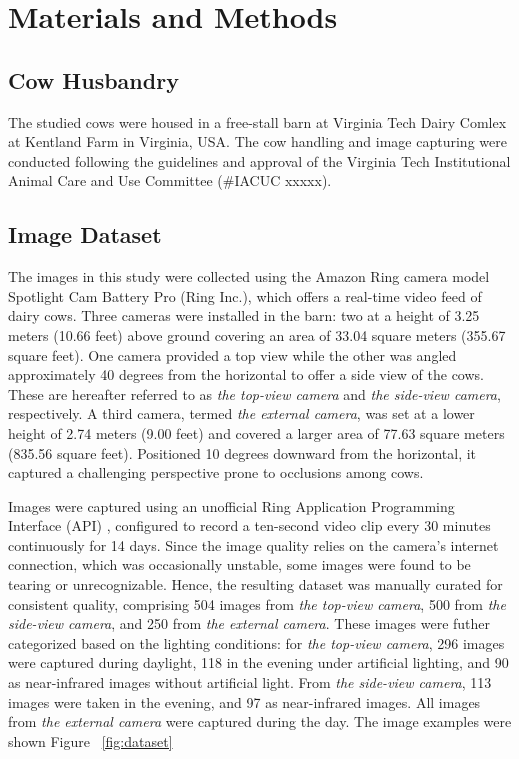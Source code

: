 \section{Materials and Methods}

\subsection*{Cow Husbandry}

The studied cows were housed in a free-stall barn at Virginia Tech Dairy Comlex at Kentland Farm in Virginia, USA. The cow handling and image capturing were conducted following the guidelines and approval of the Virginia Tech Institutional Animal Care and Use Committee (\#IACUC xxxxx).

\subsection*{Image Dataset}

The images in this study were collected using the Amazon Ring camera model Spotlight Cam Battery Pro (Ring Inc.), which offers a real-time video feed of dairy cows. Three cameras were installed in the barn: two at a height of 3.25 meters (10.66 feet) above ground covering an area of 33.04 square meters (355.67 square feet). One camera provided a top view while the other was angled approximately 40 degrees from the horizontal to offer a side view of the cows. These are hereafter referred to as \textit{the top-view camera} and \textit{the side-view camera}, respectively. A third camera, termed \textit{the external camera}, was set at a lower height of 2.74 meters (9.00 feet) and covered a larger area of 77.63 square meters (835.56 square feet). Positioned 10 degrees downward from the horizontal, it captured a challenging perspective prone to occlusions among cows.

Images were captured using an unofficial Ring Application Programming Interface (API) \citep{greif_dgreifring_2024}, configured to record a ten-second video clip every 30 minutes continuously for 14 days. Since the image quality relies on the camera's internet connection, which was occasionally unstable, some images were found to be tearing or unrecognizable. Hence, the resulting dataset was manually curated for consistent quality, comprising 504 images from \textit{the top-view camera}, 500 from \textit{the side-view camera}, and 250 from \textit{the external camera}. These images were futher categorized based on the lighting conditions: for \textit{the top-view camera}, 296 images were captured during daylight, 118 in the evening under artificial lighting, and 90 as near-infrared images without artificial light. From \textit{the side-view camera}, 113 images were taken in the evening, and 97 as near-infrared images. All images from \textit{the external camera} were captured during the day. The image examples were shown Figure ~\ref{fig:dataset}

